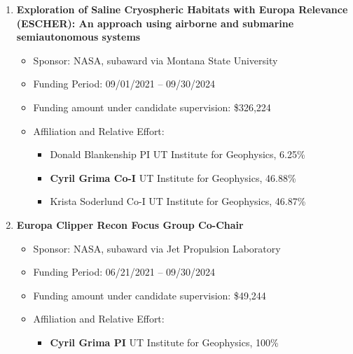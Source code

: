 \begin{enumerate}[leftmargin=2.5em, labelsep=1.5em, label=C\arabic*]
    \item
        \textbf{Exploration of Saline Cryospheric Habitats with Europa Relevance (ESCHER): An approach using airborne and submarine semiautonomous systems}
        \begin{itemize}[leftmargin=0em, labelsep=1em, topsep=-.5em, itemsep=-.2em]
            \item Sponsor: NASA, subaward via Montana State University
            \item Funding Period: 09/01/2021 – 09/30/2024
            \item Funding amount under candidate supervision: \$326,224
            \item Affiliation and Relative Effort:
            \TabPositions{4cm, 5.5cm}
            \begin{itemize}[leftmargin=2em, labelsep=1em, topsep=-.5em, itemsep=-.2em]
                \item Donald Blankenship \tab PI \tab UT Institute for Geophysics, 6.25\%
                \item \textbf{Cyril Grima \tab Co-I} \tab  UT Institute for Geophysics, 46.88\%
                \item Krista Soderlund \tab Co-I \tab  UT Institute for Geophysics, 46.87\% 
            \end{itemize}
        \end{itemize}

    \item
        \textbf{Europa Clipper Recon Focus Group Co-Chair}
        \begin{itemize}[leftmargin=0em, labelsep=1em, topsep=-.5em, itemsep=-.2em]
            \item Sponsor: NASA, subaward via Jet Propulsion Laboratory
            \item Funding Period: 06/21/2021 – 09/30/2024
            \item Funding amount under candidate supervision: \$49,244
            \item Affiliation and Relative Effort:
            \TabPositions{4cm, 5.5cm}
            \begin{itemize}[leftmargin=2em, labelsep=1em, topsep=-.5em, itemsep=-.2em]
                \item \textbf{Cyril Grima \tab PI} \tab UT Institute for Geophysics, 100\%
            \end{itemize}
        \end{itemize}


\end{enumerate}
